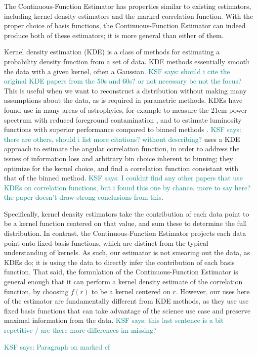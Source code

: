 \documentclass[modern]{aastex62}
\newcommand{\Est}{The Continuous-Function Estimator\xspace}
\newcommand{\est}{the Continuous-Function Estimator\xspace}
\newcommand{\KSF}[1]{\textcolor{teal}{KSF says: #1}}
\begin{document}
\Est has properties similar to existing estimators, including kernel density estimators and the marked correlation function.
With the proper choice of basis functions, \est can indeed produce both of these estimators; it is more general than either of them.

Kernel density estimation (KDE) is a class of methods for estimating a probability density function from a set of data.
KDE methods essentially smooth the data with a given kernel, often a Gaussian.
\KSF{should i cite the original KDE papers from the 50s and 60s? or not necessary bc not the focus?}
This is useful when we want to reconstruct a distribution without making many assumptions about the data, as is required in parametric methods.
KDEs have found use in many areas of astrophyics, for example to measure the 21cm power spectrum with reduced foreground contamination \citep{Trott2019}, and to estimate luminosity functions with superior performance compared to binned methods \citep{Yuan2020}.
\KSF{there are others, should i list more citations? without describing?}
\cite{Hatfield2016} uses a KDE approach to estimate the angular correlation function, in order to address the issues of information loss and arbitrary bin choice inherent to binning; they optimize for the kernel choice, and find a correlation function consistant with that of the binned method.
\KSF{I couldnt find any other papers that use KDEs on correlation functions, but i found this one by chance. more to say here? the paper doesn't draw strong conclusions from this.}

Specifically, kernel density estimators take the contribution of each data point to be a kernel function centered on that value, and sum these to determine the full distribution.
In contrast, \est projects each data point onto fixed basis functions, which are distinct from the typical understanding of kernels.
As such, our estimator is not smearing out the data, as KDEs do; it is using the data to directly infer the contribution of each basis function.
That said, the formulation of \est is general enough that it can perform a kernel density estimate of the correlation function, by choosing $f(r)$ to be a kernel centered on $r$.
However, our uses here of the estimator are fundamentally different from KDE methods, as they use use fixed basis functions that can take advantage of the science use case and preserve maximal information from the data.
\KSF{this last sentence is a bit repetitive / are there more differences im missing?}

\KSF{Paragraph on marked cf}
\end{document}
